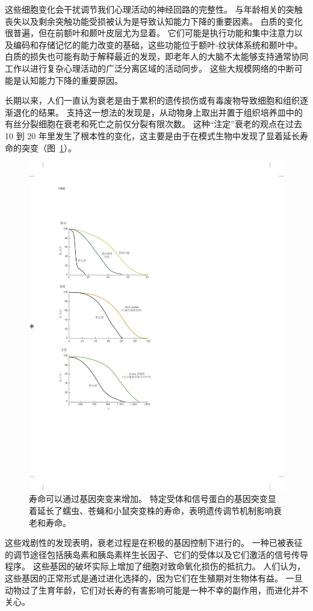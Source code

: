 这些细胞变化会干扰调节我们心理活动的神经回路的完整性。
与年龄相关的突触丧失以及剩余突触功能受损被认为是导致认知能力下降的重要因素。
白质的变化很普遍，但在前额叶和颞叶皮层尤为显着。
它们可能是执行功能和集中注意力以及编码和存储记忆的能力改变的基础，这些功能位于额叶-纹状体系统和颞叶中。
白质的损失也可能有助于解释最近的发现，即老年人的大脑不太能够支持通常协同工作以进行复杂心理活动的广泛分离区域的活动同步。
这些大规模网络的中断可能是认知能力下降的重要原因。


长期以来，人们一直认为衰老是由于累积的遗传损伤或有毒废物导致细胞和组织逐渐退化的结果。
支持这一想法的发现是，从动物身上取出并置于组织培养皿中的有丝分裂细胞在衰老和死亡之前仅分裂有限次数。
这种“注定”衰老的观点在过去 10 到 20 年里发生了根本性的变化，这主要是由于在模式生物中发现了显着延长寿命的突变（图~\ref{fig:64_6}）。


\begin{figure}[htbp]
	\centering
	\includegraphics[width=0.6\linewidth]{chap64/fig_64_6}
	\caption{寿命可以通过基因突变来增加。
		特定受体和信号蛋白的基因突变显着延长了蠕虫、苍蝇和小鼠突变株的寿命，表明遗传调节机制影响衰老和寿命\cite{hekimi2003genetics,lin1998extended,brown1996dwarf}。}
	\label{fig:64_6}
\end{figure}


这些戏剧性的发现表明，衰老过程是在积极的基因控制下进行的。
一种已被表征的调节途径包括胰岛素和胰岛素样生长因子、它们的受体以及它们激活的信号传导程序。
这些基因的破坏实际上增加了细胞对致命氧化损伤的抵抗力。
人们认为，这些基因的正常形式是通过进化选择的，因为它们在生殖期对生物体有益。
一旦动物过了生育年龄，它们对长寿的有害影响可能是一种不幸的副作用，而进化并不关心。


